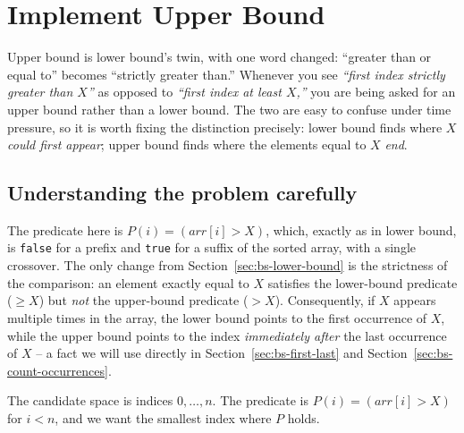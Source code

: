 \section{Implement Upper Bound}
\label{sec:bs-upper-bound}


\begin{patternbox}
Upper bound is lower bound's twin, with one word changed: ``greater than or
equal to'' becomes ``strictly greater than.'' Whenever you see \emph{``first
index strictly greater than $X$''} as opposed to \emph{``first index at
least $X$,''} you are being asked for an upper bound rather than a lower
bound. The two are easy to confuse under time pressure, so it is worth
fixing the distinction precisely: lower bound finds where $X$ \emph{could
first appear}; upper bound finds where the elements equal to $X$
\emph{end}.
\end{patternbox}

\subsection*{Understanding the problem carefully}

The predicate here is $P(i) = (\textit{arr}[i] > X)$, which, exactly as in
lower bound, is \texttt{false} for a prefix and \texttt{true} for a suffix
of the sorted array, with a single crossover. The only change from
Section~\ref{sec:bs-lower-bound} is the strictness of the comparison: an
element exactly equal to $X$ satisfies the lower-bound predicate
($\ge X$) but \emph{not} the upper-bound predicate ($> X$). Consequently,
if $X$ appears multiple times in the array, the lower bound points to the
first occurrence of $X$, while the upper bound points to the index
\emph{immediately after} the last occurrence of $X$ -- a fact we will use
directly in Section~\ref{sec:bs-first-last} and
Section~\ref{sec:bs-count-occurrences}.

\begin{ideabox}
The candidate space is indices $0, \dots, n$. The predicate is
$P(i) = (\textit{arr}[i] > X)$ for $i < n$, and we want the smallest index
where $P$ holds.
\end{ideabox}

